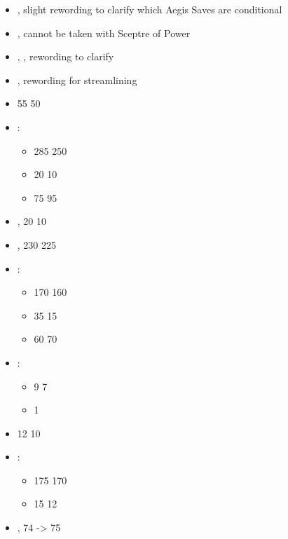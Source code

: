 \largefontsize{}

\subtitle{beta 2.2}

\begin{itemize}
\item \godslayer{}, slight rewording to clarify which Aegis Saves are conditional 
\item \sacredhourglass{}, cannot be taken with Sceptre of Power
\item \arkofages{}, \sacredark{}, rewording to clarify
\item \tombharbinger{}, \royalguard{} rewording for streamlining
\item \bookofthedead{} 55 \costdown{} 50
\item \pharaoh{}\spacebeforecolon{}:
\begin{itemize}
\item \basecost{} 285 \costdown{} 250
\item \skeletalhorse{} 20 \costdown{} 10
\item \skeletonchariot{} 75 \costup{} 95
\end{itemize}
\item \nomarch{}, \skeletalhorse{} 20 \costdown{} 10
\item \casketofphatep{}, \basecost{} 230 \costdown{} 225
\item \tombharbinger{}\spacebeforecolon{}:
\begin{itemize}
\item \basecost{} 170 \costdown{} 160
\item \skeletalhorse{} 35 \costdown{} 15
\item \skeletonchariot{} 60 \costup{} 70
\end{itemize}
\item \skeletons{}\spacebeforecolon{}:
\begin{itemize}
\item \extramodel{} 9 \costdown{} 7
\item \spear{} \free{} \costup{} 1
\end{itemize}
\item \skeletonarchers{} \extramodel{} 12 \costdown{} 10
\item \skeletoncavalry{}\spacebeforecolon{}:
\begin{itemize}
\item \basecost{} 175 \costdown{} 170
\item \extramodel{} 15 \costdown{} 12
\end{itemize}
\item \skeletonchariots{}, \extramodel{} 74 -> 75

\end{itemize}
